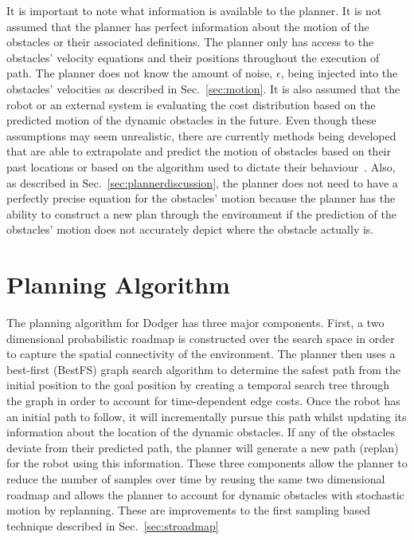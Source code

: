 It is important to note what information is available to the planner. It is not
assumed that the planner has perfect information about the motion of the
obstacles or their associated definitions. The planner only has access to the
obstacles' velocity equations and their positions throughout the execution of
path.  The planner does not know the amount of noise, $\epsilon$, being
injected into the obstacles' velocities as described in Sec.~\ref{sec:motion}.
It is also assumed that the robot or an external system is evaluating the cost
distribution based on the predicted motion of the dynamic obstacles in the
future. Even though these assumptions may seem unrealistic, there are currently
methods being developed that are able to extrapolate and predict the motion of
obstacles based on their past locations or based on the algorithm used to
dictate their behaviour~\cite{rus, cmu, boulder, edi1, edi2}. Also, as
described in Sec.~\ref{sec:plannerdiscussion}, the planner does not need to
have a perfectly precise equation for the obstacles' motion because the planner
has the ability to construct a new plan through the environment if the
prediction of the obstacles' motion does not accurately depict where the
obstacle actually is.

\section{Planning Algorithm}

\label{sec:design_planner}

The planning algorithm for Dodger has three major components. First, a two
dimensional probabilistic roadmap is constructed over the search space in order
to capture the spatial connectivity of the environment. The planner then uses a
best-first (BestFS) graph search algorithm to determine the safest path from
the initial position to the goal position by creating a temporal search tree
through the graph in order to account for time-dependent edge costs. Once the
robot has an initial path to follow, it will incrementally pursue this path
whilst updating its information about the location of the dynamic obstacles. If
any of the obstacles deviate from their predicted path, the planner will
generate a new path (replan) for the robot using this information. These three
components allow the planner to reduce the number of samples over time by
reusing the same two dimensional roadmap and allows the planner to account for
dynamic obstacles with stochastic motion by replanning. These are improvements
to the first sampling based technique described in Sec.~\ref{sec:stroadmap}

